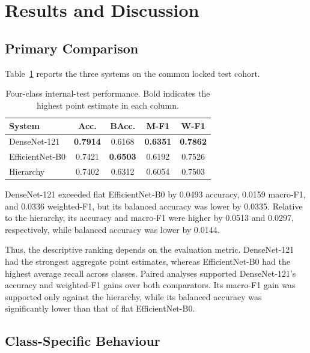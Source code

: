 \section{Results and Discussion}
\label{sec:results_discussion}

\subsection{Primary Comparison}

Table~\ref{tab:primary_results} reports the three systems on the common locked
test cohort.

\begin{table}[t]
    \centering
    \caption{Four-class internal-test performance. Bold indicates the highest
    point estimate in each column.}
    \label{tab:primary_results}
    \footnotesize
    \setlength{\tabcolsep}{2.5pt}
    \begin{tabular}{lcccc}
        \toprule
        System & Acc. & BAcc. & M-F1 & W-F1 \\
        \midrule
        DenseNet-121
        & \textbf{0.7914}
        & 0.6168
        & \textbf{0.6351}
        & \textbf{0.7862} \\

        EfficientNet-B0
        & 0.7421
        & \textbf{0.6503}
        & 0.6192
        & 0.7526 \\

        Hierarchy
        & 0.7402
        & 0.6312
        & 0.6054
        & 0.7503 \\
        \bottomrule
    \end{tabular}
\end{table}

DenseNet-121 exceeded flat EfficientNet-B0 by 0.0493 accuracy, 0.0159
macro-F1, and 0.0336 weighted-F1, but its balanced accuracy was lower by
0.0335. Relative to the hierarchy, its accuracy and macro-F1 were higher by
0.0513 and 0.0297, respectively, while balanced accuracy was lower by 0.0144.

Thus, the descriptive ranking depends on the evaluation metric. DenseNet-121
had the strongest aggregate point estimates, whereas EfficientNet-B0 had the
highest average recall across classes. Paired analyses supported DenseNet-121's accuracy and weighted-F1 gains
over both comparators. Its macro-F1 gain was supported only against the
hierarchy, while its balanced accuracy was significantly lower than that
of flat EfficientNet-B0.

\subsection{Class-Specific Behaviour}

